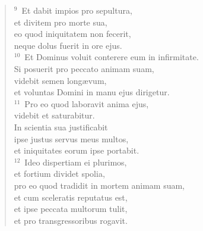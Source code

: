 \begin{verse}
${}^{9}$~Et dabit impios pro sepultura,\\ et divitem pro morte sua,\\ eo quod iniquitatem non fecerit,\\ neque dolus fuerit in ore ejus.\\
${}^{10}$~Et Dominus voluit conterere eum in infirmitate.\\ Si posuerit pro peccato animam suam,\\ videbit semen long\ae vum,\\ et voluntas Domini in manu ejus dirigetur.\\
${}^{11}$~Pro eo quod laboravit anima ejus,\\ videbit et saturabitur.\\ In scientia sua justificabit\\ ipse justus servus meus multos,\\ et iniquitates eorum ipse portabit.\\
${}^{12}$~Ideo dispertiam ei plurimos,\\ et fortium dividet spolia,\\ pro eo quod tradidit in mortem animam suam,\\ et cum sceleratis reputatus est,\\ et ipse peccata multorum tulit,\\ et pro transgressoribus rogavit.\end{verse}


